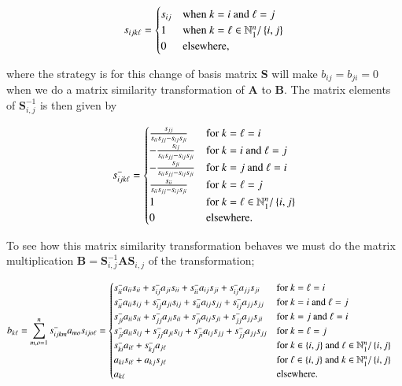 \documentclass[11pt,english,a4paper]{article}
\begin{document}
\begin{flushleft}
\begin{align}
s_{ijk\ell} = \begin{cases} s_{ij} & \text{when $k=i$ and $\ell=j$} \\ 1 & \text{when } k = \ell \in \mathbb{N}_1^n / \left\lbrace{i,j}\right\rbrace \\ 0 & \text{elsewhere,} \end{cases}  
\label{eq_8}
\end{align}

where the strategy is for this change of basis matrix $\mathbf{S}$ will make $b_{ij} = b_{ji} = 0$ when we do a matrix similarity transformation of $\mathbf{A}$ to $\mathbf{B}$. The matrix elements of $\mathbf{S}_{i,j}^{-1}$ is then given by

\begin{align*}
s_{ijk\ell}^- = \begin{cases} \frac{s_{jj}}{s_{ii}s_{jj}-s_{ij}s_{ji}} & \text{for $k=\ell=i$} \\ -\frac{s_{ij}}{s_{ii}s_{jj}-s_{ij}s_{ji}} & \text{for $k=i$ and $\ell=j$} \\ -\frac{s_{ji}}{s_{ii}s_{jj}-s_{ij}s_{ji}} & \text{for $k=j$ and $\ell=i$} \\ \frac{s_{ii}}{s_{ii}s_{jj}-s_{ij}s_{ji}} & \text{for $k=\ell=j$} \\ 1 & \text{for $k=\ell\in\mathbb{N}_1^n/\left\lbrace{i,j}\right\rbrace$} \\ 0 & \text{elsewhere.} \end{cases}
\end{align*}

To see how this matrix similarity transformation behaves we must do the matrix multiplication $\mathbf{B} = \mathbf{S}_{i,j}^{-1} \mathbf{A}\mathbf{S}_{i,j}$ of the transformation;

\begin{align}
b_{k\ell} &= \sum_{m,o=1}^n s_{ijkm}^- a_{mo} s_{ijo\ell} = \begin{cases} s_{ii}^- a_{ii} s_{ii} + s_{ij}^- a_{ji} s_{ii} + s_{ii}^- a_{ij} s_{ji} + s_{ij}^- a_{jj} s_{ji} & \text{for $k=\ell=i$} \\ s_{ii}^- a_{ii} s_{ij} + s_{ij}^- a_{ji} s_{ij} + s_{ii}^- a_{ij} s_{jj} + s_{ij}^- a_{jj} s_{jj} & \text{for $k=i$ and $\ell = j$} \\ s_{ji}^- a_{ii} s_{ii} + s_{jj}^- a_{ji} s_{ii} + s_{ji}^- a_{ij} s_{ji} + s_{jj}^- a_{jj} s_{ji} & \text{for $k=j$ and $\ell=i$} \\ s_{ji}^- a_{ii} s_{ij} + s_{jj}^- a_{ji} s_{ij} + s_{ji}^- a_{ij} s_{jj} + s_{jj}^- a_{jj} s_{jj} & \text{for $k=\ell=j$} \\ s_{ki}^- a_{i \ell} + s_{kj}^- a_{j\ell} & \text{for $k\in\left\lbrace{i,j}\right\rbrace$ and $\ell\in\mathbb{N}_1^n / \left\lbrace{i,j}\right\rbrace$} \\ a_{ki} s_{i\ell} + a_{kj}s_{j\ell} & \text{for $\ell\in\left\lbrace{i,j}\right\rbrace$ and $k\in\mathbb{N}_1^n / \left\lbrace{i,j}\right\rbrace$} \\ a_{k\ell} & \text{elsewhere.}\end{cases}
\label{eq_9}
\end{align}


\end{flushleft}
\end{document}
